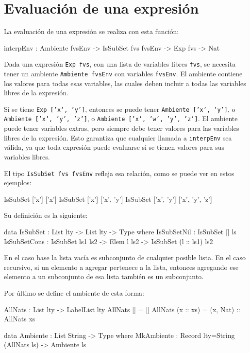 \section{Evaluación de una expresión}

La evaluación de una expresión se realiza con esta función:

\begin{code}
interpEnv : Ambiente fvsEnv -> IsSubSet fvs fvsEnv -> Exp fvs -> Nat
\end{code}

Dada una expresión \texttt{Exp fvs}, con una lista de variables libres \texttt{fvs}, se necesita tener un ambiente \texttt{Ambiente fvsEnv} con variables \texttt{fvsEnv}. El ambiente contiene los valores para todas esas variables, las cuales deben incluir a todas las variables libres de la expresión.

Si se tiene \texttt{Exp ['x', 'y']}, entonces se puede tener \texttt{Ambiente ['x', 'y']}, o \texttt{Ambiente ['x', 'y', 'z']}, o \texttt{Ambiente ['x', 'w', 'y', 'z']}. El ambiente puede tener variables extras, pero siempre debe tener valores para las variables libres de la expresión. Esto garantiza que cualquier llamada a \texttt{interpEnv} sea válida, ya que toda expresión puede evaluarse si se tienen valores para sus variables libres.

El tipo \texttt{IsSubSet fvs fvsEnv} refleja esa relación, como se puede ver en estos ejemplos:

\begin{code}
IsSubSet ['x'] ['x']
IsSubSet ['x'] ['x', 'y']
IsSubSet ['x', 'y'] ['x', 'y', 'z']
\end{code}

Su definición es la siguiente:

\begin{code}
data IsSubSet : List lty -> List lty -> Type where
  IsSubSetNil : IsSubSet [] ls
  IsSubSetCons : IsSubSet ls1 ls2 -> Elem l ls2 -> 
    IsSubSet (l :: ls1) ls2
\end{code}

En el caso base la lista vacía es subconjunto de cualquier posible lista. En el caso recursivo, si un elemento a agregar pertenece a la lista, entonces agregando ese elemento a un subconjunto de esa lista también es un subconjunto.

Por último se define el ambiente de esta forma:

\begin{code}
AllNats : List lty -> LabelList lty
AllNats [] = []
AllNats (x :: xs) = (x, Nat) :: AllNats xs

data Ambiente : List String -> Type where
  MkAmbiente : Record {lty=String} (AllNats ls) -> Ambiente ls
\end{code}


